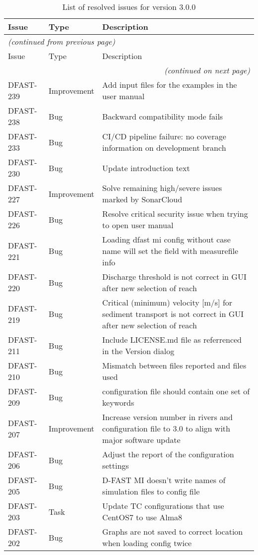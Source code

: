 \documentclass[git]{deltares_manual}
\begin{document}
\begin{longtable}{l|l|p{8cm}}
\caption{List of resolved issues for version 3.0.0} \\
Issue & Type & Description \\ \hline
\endfirsthead
\multicolumn{3}{l}{\textsl{(continued from previous page)}} \\
Issue & Type & Description \\ \hline
\endhead
\hline \multicolumn{3}{r}{\textsl{(continued on next page)}} \\
\endfoot
\endlastfoot 
DFAST-239 & Improvement & Add input files for the examples in the user manual \\
DFAST-238 & Bug & Backward compatibility mode fails \\
DFAST-233 & Bug & CI/CD pipeline failure: no coverage information on development branch \\
DFAST-230 & Bug & Update introduction text \\
DFAST-227 & Improvement & Solve remaining high/severe issues marked by SonarCloud \\
DFAST-226 & Bug & Resolve critical security issue when trying to open user manual \\
DFAST-221 & Bug & Loading dfast mi config without case name will set the field with measurefile info \\
DFAST-220 & Bug & Discharge threshold is not correct in GUI after new selection of reach \\
DFAST-219 & Bug & Critical (minimum) velocity [m/s] for sediment transport is not correct in GUI after new selection of reach \\
DFAST-211 & Bug & Include LICENSE.md file as referrenced in the Version dialog \\
DFAST-210 & Bug & Mismatch between files reported and files used \\
DFAST-209 & Bug & configuration file should contain one set of keywords \\
DFAST-207 & Improvement & Increase version number in rivers and configuration file to 3.0 to align with major software update \\
DFAST-206 & Bug & Adjust the report of the configuration settings \\
DFAST-205 & Bug & D-FAST MI doesn't write names of simulation files to config file \\
DFAST-203 & Task & Update TC configurations that use CentOS7 to use Alma8 \\
DFAST-202 & Bug & Graphs are not saved to correct location when loading config twice \\

\end{longtable}
\end{document}
